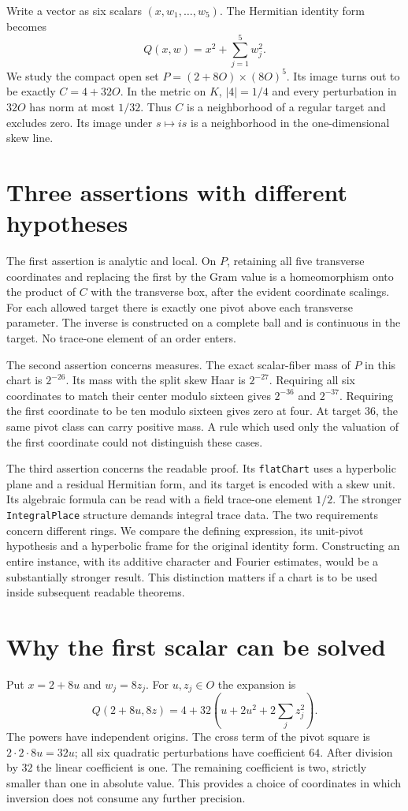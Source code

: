\documentclass[12pt,letterpaper]{article}
\newcommand{\id}[1]{{\small\nolinkurl{#1}}}
\begin{document}
Write a vector as six scalars $(x,w_1,\ldots,w_5)$. The Hermitian identity form becomes
\[
    Q(x,w)=x^2+\sum_{j=1}^5 w_j^2 .
\]
We study the compact open set $P=(2+8O)\times(8O)^5$. Its image turns out to be exactly $C=4+32O$. In the metric on $K$, $|4|=1/4$ and every perturbation in $32O$ has norm at most $1/32$. Thus $C$ is a neighborhood of a regular target and excludes zero. Its image under $s\mapsto is$ is a neighborhood in the one-dimensional skew line.

\section{Three assertions with different hypotheses}
The first assertion is analytic and local. On $P$, retaining all five transverse coordinates and replacing the first by the Gram value is a homeomorphism onto the product of $C$ with the transverse box, after the evident coordinate scalings. For each allowed target there is exactly one pivot above each transverse parameter. The inverse is constructed on a complete ball and is continuous in the target. No trace-one element of an order enters.

The second assertion concerns measures. The exact scalar-fiber mass of $P$ in this chart is $2^{-26}$. Its mass with the split skew Haar is $2^{-27}$. Requiring all six coordinates to match their center modulo sixteen gives $2^{-36}$ and $2^{-37}$. Requiring the first coordinate to be ten modulo sixteen gives zero at four. At target $36$, the same pivot class can carry positive mass. A rule which used only the valuation of the first coordinate could not distinguish these cases.

The third assertion concerns the readable proof. Its \id{flatChart} uses a hyperbolic plane and a residual Hermitian form, and its target is encoded with a skew unit. Its algebraic formula can be read with a field trace-one element $1/2$. The stronger \id{IntegralPlace} structure demands integral trace data. The two requirements concern different rings. We compare the defining expression, its unit-pivot hypothesis and a hyperbolic frame for the original identity form. Constructing an entire instance, with its additive character and Fourier estimates, would be a substantially stronger result. This distinction matters if a chart is to be used inside subsequent readable theorems.

\section{Why the first scalar can be solved}
Put $x=2+8u$ and $w_j=8z_j$. For $u,z_j\in O$ the expansion is
\[
 Q(2+8u,8z)=4+32\left(u+2u^2+2\sum_j z_j^2\right).
\]
The powers have independent origins. The cross term of the pivot square is $2\cdot2\cdot8u=32u$; all six quadratic perturbations have coefficient $64$. After division by $32$ the linear coefficient is one. The remaining coefficient is two, strictly smaller than one in absolute value. This provides a choice of coordinates in which inversion does not consume any further precision.
\end{document}
